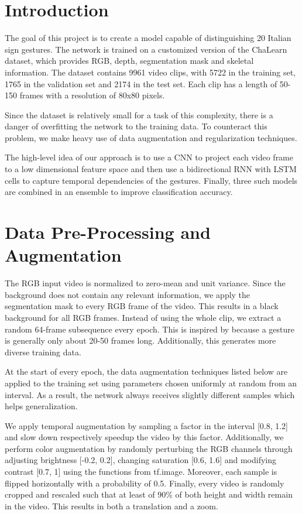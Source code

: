 \section{Introduction}

The goal of this project is to create a model capable of distinguishing 20 Italian sign gestures. The network is trained on a customized version of the ChaLearn dataset\cite{ChaLearn17}, which provides RGB, depth, segmentation mask and skeletal information. The dataset contains 9961 video clips, with 5722 in the training set, 1765 in the validation set and 2174 in the test set. Each clip has a length of 50-150 frames with a resolution of 80x80 pixels.

Since the dataset is relatively small for a task of this complexity, there is a danger of overfitting the network to the training data. To counteract this problem, we make heavy use of data augmentation and regularization techniques.

The high-level idea of our approach is to use a CNN to project each video frame to a low dimensional feature space and then use a bidirectional RNN with LSTM cells\cite{LSTM97} to capture temporal dependencies of the gestures. Finally, three such models are combined in an ensemble to improve classification accuracy. 


\section{Data Pre-Processing and Augmentation}\label{sec:data}

The RGB input video is normalized to zero-mean and unit variance. Since the background does not contain any relevant information, we apply the segmentation mask to every RGB frame of the video. This results in a black background for all RGB frames.
Instead of using the whole clip, we extract a random 64-frame subsequence every epoch. This is inspired by \cite{Pigou16} because a gesture is generally only about 20-50 frames long. Additionally, this generates more diverse training data.

At the start of every epoch, the data augmentation techniques listed below are applied to the training set using parameters chosen uniformly at random from an interval. As a result, the network always receives slightly different samples which helps generalization. 

We apply temporal augmentation by sampling a factor in the interval [0.8, 1.2] and slow down respectively speedup the video by this factor.
Additionally, we perform color augmentation by randomly perturbing the RGB channels through adjusting brightness [-0.2, 0.2], changing saturation [0.6, 1.6] and modifying contrast [0.7, 1] using the functions from tf.image.
Moreover, each sample is flipped horizontally with a probability of 0.5.
Finally, every video is randomly cropped and rescaled such that at least of 90\% of both height and width remain in the video. This results in both a translation and a zoom.



